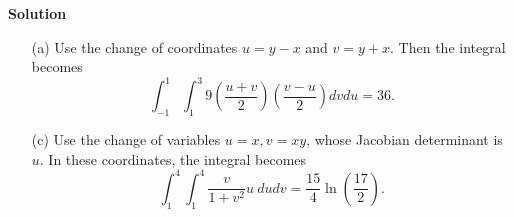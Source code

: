 \documentclass[12pt,oneside]{exam}
\newenvironment{newsolution}{\vspace{.1in}\noindent\textbf{Solution \hspace{.05em}}}{}
\begin{document}
\begin{newsolution}
\begin{itemize}
\item[(a)] Use the change of coordinates $u=y-x$ and $v=y+x$. Then the integral becomes
\begin{equation*}
\int_{-1}^{1} \int_{1}^{3} 9\left(\frac{u+v}{2}\right) \left(\frac{v-u}{2}\right) dv du =36.
\end{equation*}
\item[(c)] Use the change of variables $u=x, v=xy$, whose Jacobian determinant is $u$. In these coordinates, the integral becomes 
\begin{equation*}
\int_{1}^{4} \int_{1}^{4} \frac{v}{1+v^2} u\ dudv = \frac{15}{4}\ln\left(\frac{17}{2}\right).
\end{equation*}
\end{itemize}
\end{newsolution}
\end{document}
